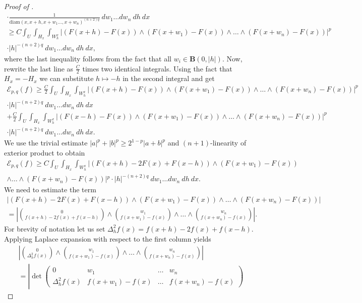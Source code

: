 \documentclass[11pt]{amsart}
\newcommand{\diam}{\mathrm{diam}}
\newcommand{\Epq}{\mathcal{E}_{p,q}}
\theoremstyle{definition}
\begin{document}
\begin{proof}[Proof of ]
\begin{multline*}
		\cdot\frac{1}{\diam(x, x+h,x+w_1\dots,x+w_n)^{(n+2)q}}\ dw_1 \dots dw_n\ dh\ dx\\
		\geq C\int_{ U}\int_{H_x}\int_{W^x_h}|(F(x+h)-F(x))\wedge(F(x+w_1)-F(x))\wedge\dots\wedge (F(x+w_n)-F(x))|^p\\
		\cdot |h|^{-(n+2)q}\ dw_1 \dots dw_n\ dh\ dx,
		\end{multline*}
		where the last inequality follows from the fact that all $w_i\in \textbf{B}(0,|h|)$. Now, rewrite the last line as $\frac{C}{2}$ times two identical integrals. Using the fact that $H_x=-H_x$ we can substitute $h\mapsto -h$ in the second integral and get
		\begin{multline*}
		\Epq(f)\geq \frac{C}{2}\int_{ U}\int_{H_x}\int_{W^x_h}|(F(x+h)-F(x))\wedge(F(x+w_1)-F(x))\wedge\dots\wedge (F(x+w_n)-F(x))|^p\\
		\cdot |h|^{-(n+2)q}\ dw_1 \dots dw_n\ dh\ dx\\
		+\frac{C}{2}\int_{ U}\int_{H_x}\int_{W^x_h}|(F(x-h)-F(x))\wedge(F(x+w_1)-F(x))\wedge\dots\wedge (F(x+w_n)-F(x))|^p\\
		\cdot |h|^{-(n+2)q}\ dw_1 \dots dw_n\ dh\ dx.
		\end{multline*}
		We use the trivial estimate $|a|^p+|b|^p\geq 2^{1-p}|a+b|^p$ and $(n+1)$-linearity of exterior product to obtain
		\begin{multline}\label{eq:epq_est}
		\Epq(f)\geq
		C\int_{ U}\int_{H_x}\int_{W^x_h}|(F(x+h)-2F(x)+F(x-h))\wedge(F(x+w_1)-F(x))\\
		\wedge\dots\wedge (F(x+w_n)-F(x))|^p\cdot |h|^{-(n+2)q}\ dw_1 \dots dw_n\ dh\ dx.
		\end{multline}
		We need to estimate the term
		\begin{multline*}
		|(F(x+h)-2F(x)+F(x-h))\wedge(F(x+w_1)-F(x))\wedge\dots\wedge (F(x+w_n)-F(x))|\\
		= \left|\binom{0}{f(x+h)-2f(x)+f(x-h)}\wedge\binom{w_1}{f(x+w_1)-f(x)}\wedge\dots\wedge\binom{w_n}{f(x+w_n)-f(x)}\right|.
		\end{multline*}
		For brevity of notation let us set $\Delta^2_hf(x)=f(x+h)-2f(x)+f(x-h).$ 
		Applying Laplace expansion with respect to the first column yields		
		\begin{multline*}
		\left|\binom{0}{\Delta^2_hf(x)}\wedge\binom{w_1}{f(x+w_1)-f(x)}\wedge\dots\wedge\binom{w_n}{f(x+w_n)-f(x)}\right|\\
		= 	\left|\det \begin{pmatrix}
		0 & w_1 & \dots & w_n \\ 
		\Delta^2_hf(x) &  f(x+w_1)-f(x) & \dots & f(x+w_n)-f(x)

\end{pmatrix}
\end{multline*}
\end{proof}
\end{document}
